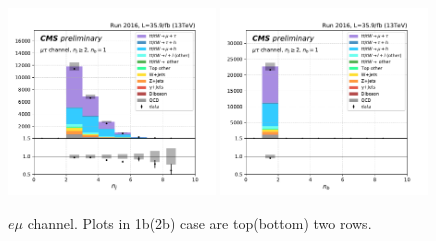 \begin{figure}[ht]
    \includegraphics[width=0.49\textwidth]{chapters/Appendix/sectionPlots/figures/kinematics_pickles/mutau/1b/mutau_1b_nJets.pdf}
    \includegraphics[width=0.49\textwidth]{chapters/Appendix/sectionPlots/figures/kinematics_pickles/mutau/1b/mutau_1b_nBJets.pdf}
    
    \caption{$e\mu$ channel. Plots in 1b(2b) case are top(bottom) two rows.}
\end{figure}

